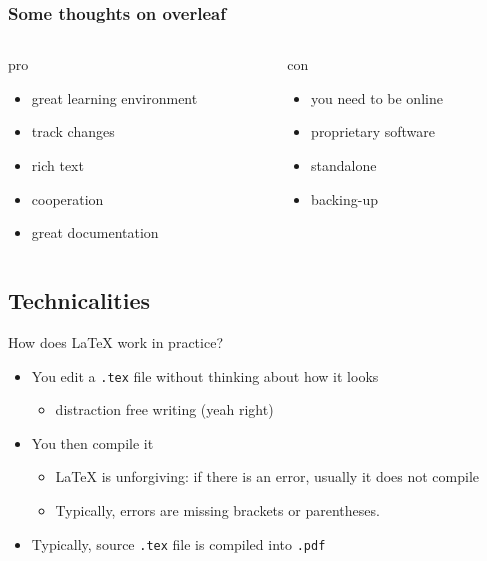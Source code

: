 \documentclass[ignorenonframetext]{beamer}
\begin{document}
\begin{frame}[fragile]
  \frametitle{Some thoughts on overleaf}
  \begin{columns}
    \begin{column}{.5\textwidth}
      \alert{pro}
      \begin{itemize}
        \item great learning environment
        \item track changes
        \item rich text
        \item cooperation
        \item great documentation\pause
      \end{itemize}
    \end{column}
    \begin{column}{.5\textwidth}
      \vspace*{0cm}
      \alert{con}

      \begin{itemize}
        \item you need to be online
        \item proprietary software
        \item standalone
        \item backing-up
      \end{itemize}
    \end{column}
  \end{columns}

\end{frame}

\subsection{Technicalities}\label{technicalities}

\begin{frame}[fragile]{How does \LaTeX{} work in practice?}

\begin{itemize}
\item
  You edit a \texttt{.tex} file without thinking about how it looks

  \begin{itemize}
  \item
    distraction free writing (yeah right)
    \newline
  \end{itemize}
\item
  You then compile it

  \begin{itemize}
  \item
    \LaTeX{} is unforgiving: if there is an error, usually it does not
    compile
  \item
    Typically, errors are missing brackets or parentheses.\newline
  \end{itemize}
\item
  Typically, source \texttt{.tex} file is compiled into \texttt{.pdf}
\end{itemize}
\end{frame}
\end{document}

